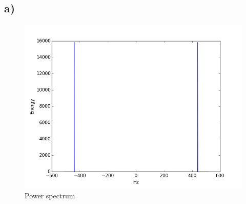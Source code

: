 \subsection*{a)}
\begin{figure}[H]
\includegraphics[width=\textwidth]{2a_power_spectrum}
\caption{Power spectrum}
\label{fig:2a}
\end{figure}


